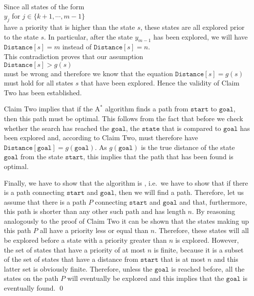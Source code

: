 \\[0.2cm]
Since all states of the form
\\[0.2cm]
\hspace*{1.3cm}
$y_j$ \quad for $j \in \{k+1, \cdots, m-1\}$
\\[0.2cm]
have a priority that is higher than the state $s$, these states are all explored prior to the state
$s$.  In particular, after the state $y_{m-1}$ has been explored, we will have 
\\[0.2cm]
\hspace*{1.3cm}
$\mathtt{Distance}[s] = m$ \quad instead of \quad $\mathtt{Distance}[s] = n$.
\\[0.2cm]
This contradiction proves that our assumption 
\\[0.2cm]
\hspace*{1.3cm}
 $\texttt{Distance}[s] > g(s)$
\\[0.2cm]
must be wrong and therefore we know that the equation $\texttt{Distance}[s] = g(s)$ must hold for all states
$s$ that have been explored.   Hence the validity of Claim Two has been established.  
\vspace*{0.2cm}

\noindent
Claim Two implies that if the $\textrm{A}^*$ algorithm finds a path from $\texttt{start}$ to $\texttt{goal}$, then this
path must be optimal.  This follows from the fact that before we check whether the search has reached the
$\texttt{goal}$, the $\texttt{state}$ that is compared to $\texttt{goal}$ has been explored and, according to
Claim Two, must therefore have $\mathtt{Distance}[\mathtt{goal}] = g(\mathtt{goal})$.  As $g(\mathtt{goal})$ is
the true distance of the state $\texttt{goal}$ from the state $\texttt{start}$, this implies that the path that
has been found is optimal.  

Finally, we have to show that the algorithm is , i.e.~we have to show that if there is a path
connecting $\texttt{start}$ and $\texttt{goal}$, then we will find a path.  Therefore, let us assume that there
is a path $P$ connecting $\texttt{start}$ and $\texttt{goal}$ and that, furthermore, this path is shorter than
any other such path and has length $n$.  By reasoning analogously to the proof of Claim Two it can be shown
that the states making up this path $P$ all have a priority less or equal than $n$.  Therefore, these states
will all be explored before a state with a priority greater than $n$ is explored.  However, the set of states
that have a priority of at most $n$ is finite, because it is a subset of the set of states that have a distance
from $\texttt{start}$ that is at most $n$ and this latter set is obviously finite.  Therefore, unless the
$\texttt{goal}$ is reached before, all the states on the path $P$ will eventually be explored and this implies that
the $\texttt{goal}$ is eventually found. 
\qed



